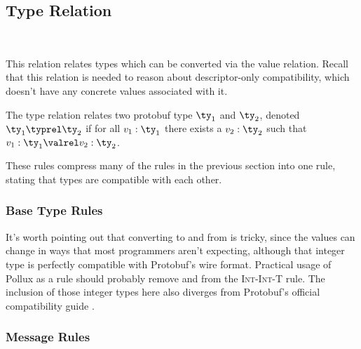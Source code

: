 \subsection{Type Relation}~\label{sec:typ-rel}

This relation relates types which can be converted via the value
relation. Recall that this relation is needed to reason about descriptor-only
compatibility, which doesn't have any concrete values associated with it.

\begin{definition}
  The type relation relates two protobuf type $\ty_1$ and $\ty_2$, denoted $\ty_1 \typrel
  \ty_2$ if for all $v_1:\ty_1$ there exists a $v_2:\ty_2$ such that $v_1:\ty_1 \valrel v_2:\ty_2$.
\end{definition}

These rules compress many of the rules in the previous section into one rule,
stating that types are compatible with each other.

\subsubsection{Base Type Rules}

\begin{mathpar}


\end{mathpar}

It's worth pointing out that converting to and from  is tricky, since
the values can change in ways that most programmers aren't expecting, although
that integer type is perfectly compatible with Protobuf's wire format. Practical
usage of Pollux as a rule should probably remove \sints{} and \sintl{} from the
\textsc{Int-Int-T} rule. The inclusion of those integer types here also diverges
from Protobuf's official compatibility guide \cite{LanguageGuideProto}.

\subsubsection{Message Rules}

